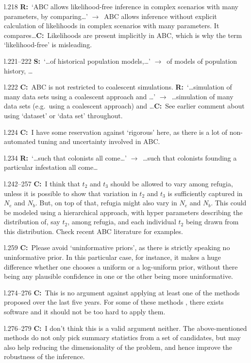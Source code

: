 \documentclass[11pt]{article}
\newenvironment{my_description}
{\begin{description}
  \setlength{\itemsep}{2pt}
  \setlength{\parskip}{0pt}
  \setlength{\parsep}{0pt}}
{\end{description}}
\newcommand{\ra}{$\rightarrow$\ }
\newcommand{\C}{\textbf{C:}\ }
\newcommand{\R}{\textbf{R:}\ }
\newcommand{\V}{\textbf{S:}\ }
\begin{document}
\begin{my_description}
	\item[l.218] \R `ABC allows likelihood-free inference in complex scenarios with many parameters, by comparing\dots' \ra ABC allows inference without explicit calculation of likelihoods in complex scenarios with many parameters. It compares\dots \C Likelihoods are present implicitly in ABC, which is why the term `likelihood-free' is misleading.
	\item[l.221--222] \V `\dots of historical population models,\dots' \ra of models of population history, \dots
	\item[l.222] \C ABC is not restricted to coalescent simulations. \R `\dots simulation of many data sets using a coalescent approach and \dots' \ra \dots simulation of many data sets (e.g.\ using a coalescent approach) and \dots \C See earlier comment about using `dataset' or `data set' throughout.
	\item[l.224] \C I have some reservation against `rigorous' here, as there is a lot of non-automated tuning and uncertainty involved in ABC.
	\item[l.234] \R `\dots such that colonists all come\dots' \ra \dots such that colonists founding a particular infestation all come\dots
	\item[l.242--257] \C I think that $t_2$ and $t_3$ should be allowed to vary among refugia, unless it is possible to show that variation in $t_2$ and $t_3$ is sufficiently captured in $N_e$ and $N_b$. But, on top of that, refugia might also vary in $N_e$ and $N_b$. This could be modeled using a hierarchical approach, with hyper parameters describing the distribution of, say $t_2$, among refugia, and each individual $t_2$ being drawn from this distribution. Check recent ABC literature for examples.
	\item[l.259] \C Please avoid `uninformative priors', as there is strictly speaking no uninformative prior. In this particular case, for instance, it makes a huge difference whether one chooses a uniform or a log-uniform prior, without there being any plausible confidence in one or the other being more uninformative.
	\item[l.274--276] \C This is no argument against applying at least one of the methods proposed over the last five years. For some of these methods \citep[e.g.][]{Wegmann:2010uq, Aeschbacher:2011fk}, there exists software and it should not be too hard to apply them.
	\item[l.276--279] \C I don't think this is a valid argument neither. The above-mentioned methods do not only pick summary statistics from a set of candidates, but may also help reducing the dimensionality of the problem, and hence improve the robustness of the inference.

\end{my_description}
\end{document}
